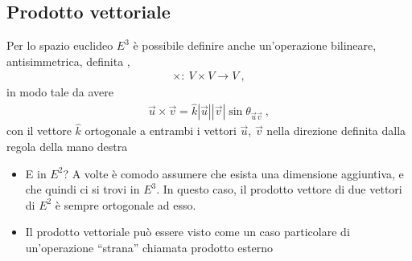 \documentclass[letterpaper,10pt,english]{jupyterBook}
\begin{document}
\subsection{Prodotto vettoriale}
\label{\detokenize{ch/algebra/vector-algebra-euclidean-space:prodotto-vettoriale}}\label{\detokenize{ch/algebra/vector-algebra-euclidean-space:math-hs-algebra-vector-euclidean-space-vector-product}}
\sphinxAtStartPar
Per lo spazio euclideo \(E^3\) è possibile definire anche un’operazione bilineare, antisimmetrica, definita ,
\begin{equation*}
\begin{split}\times: \ V \times V \rightarrow V \ ,\end{split}
\end{equation*}
\sphinxAtStartPar
in modo tale da avere
\begin{equation*}
\begin{split}\vec{u} \times \vec{v} = \hat{k} |\vec{u}| |\vec{v}| \sin \theta_{\vec{u} \vec{v}} \ ,\end{split}
\end{equation*}
\sphinxAtStartPar
con il vettore \(\hat{k}\) ortogonale a entrambi i vettori \(\vec{u}\), \(\vec{v}\) nella direzione definita dalla regola della mano destra 
\begin{itemize}
\item {} 
\sphinxAtStartPar
{} E in \(E^2\)? A volte è comodo assumere che esista una dimensione aggiuntiva, e che quindi ci si trovi in \(E^3\). In questo caso, il prodotto vettore di due vettori di \(E^2\) è sempre ortogonale ad esso.

\item {} 
\sphinxAtStartPar
{} Il prodotto vettoriale può essere visto come un caso particolare di un’operazione “strana” chiamata prodotto esterno

\end{itemize}
\end{document}
